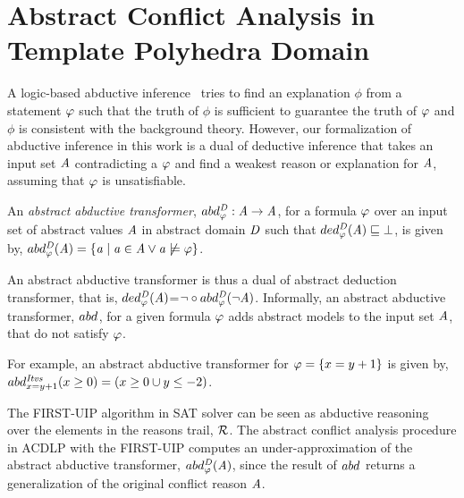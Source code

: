 \section{Abstract Conflict Analysis in Template Polyhedra Domain}\label{sec:conflict}
%
A logic-based abductive inference~\cite{abd1} tries to find an explanation $\phi$ 
from a statement $\varphi$ such that the truth of $\phi$ is sufficient to 
guarantee the truth of $\varphi$ and $\phi$ is consistent with the background
theory.  However, our formalization of abductive inference in this work is a dual of 
deductive inference that takes an input set $\mathit{A}$ contradicting a 
$\varphi$ and find a weakest reason or explanation for $\mathit{A}$, assuming 
that $\varphi$ is unsatisfiable.
%
\begin{definition}
An \emph{abstract abductive transformer}, 
$abd_{\varphi}^{\mathit{D}}: \mathit{A} \rightarrow \mathit{A}$, for a 
formula $\varphi$ over an input set of abstract values 
$\mathit{A}$ in abstract domain $\mathit{D}$ such that 
$ded_{\varphi}^{\mathit{D}}(\mathit{A}) \sqsubseteq \bot$, is given by, 
$abd_{\varphi}^{\mathit{D}}(\mathit{A})=\{\mathit{a} \mid \mathit{a} \in \mathit{A} 
\vee \mathit{a}\not\models\varphi\}$. \\
\end{definition}
%
An abstract abductive transformer is thus a dual of abstract
deduction transformer, that is, 
$ded_{\varphi}^{\mathit{D}}(\mathit{A})$=$\neg\circ abd_{\varphi}^{\mathit{D}}(\neg\mathit{A})$. 
Informally, an abstract abductive transformer,
$abd_{}^{}$, for a given formula $\varphi$ adds abstract models to the input set
$\mathit{A}$, that do not satisfy $\varphi$. 
%
\begin{exmp}
For example, an abstract abductive transformer for $\varphi=\{x=y+1\}$ 
is given by, $abd_{x=y+1}^{\mathit{Itvs}}(x \geq 0)=(x \geq 0 \cup y \leq -2)$.
\end{exmp}
%
The FIRST-UIP algorithm in SAT solver can be seen as abductive 
reasoning~\cite{leo-thesis} over the elements in the reasons 
trail, $\mathcal{R}$.  The abstract conflict analysis procedure in 
ACDLP with the FIRST-UIP computes an under-approximation of the 
abstract abductive transformer, $abd_{\varphi}^{\mathit{D}}(\mathit{A})$, 
since the result of $abd_{}^{}$ returns a generalization of the 
original conflict reason $\mathit{A}$. 

